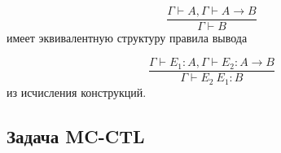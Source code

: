 \documentclass[12pt]{article}
\begin{document}
$$\frac{\Gamma \vdash A, \Gamma \vdash A \xrightarrow{} B}{\Gamma \vdash B}$$
имеет эквивалентную структуру правила вывода 

$$\frac{\Gamma \vdash E_1:A, \Gamma \vdash E_2: A \xrightarrow{} B}{\Gamma \vdash E_2\ E_1 :B}$$ из исчисления конструкций.

\subsection{Задача MC-CTL}




  







\end{document}

